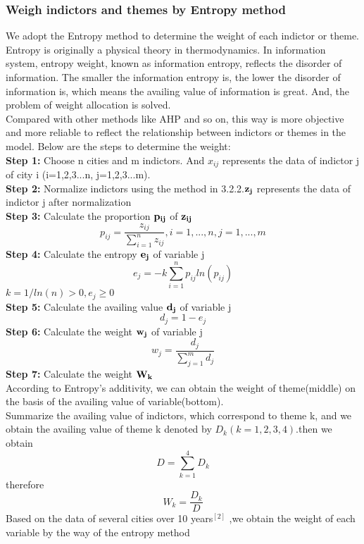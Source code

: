 \documentclass{mcmthesis}
\begin{document}
\subsubsection{Weigh indictors and themes by Entropy method}%
We adopt the Entropy method to determine the weight of each indictor or theme.\\
Entropy is originally a physical theory in thermodynamics. In information system, entropy weight, known as information entropy, reflects the disorder of information. The smaller  the information entropy is, the lower the disorder of information is, which means the availing value of information is great. And, the problem of weight allocation is solved. \\
Compared with other methods like AHP and so on, this way is more objective and more reliable to reflect the relationship between indictors or themes in the model. Below are the steps to determine the weight:\\
{\bf Step 1:} Choose n cities and m indictors. And $x_{ij}$ represents the data of indictor j of city i (i=1,2,3...n, j=1,2,3...m).\\
{\bf Step 2:}  Normalize indictors using the method in 3.2.2.$\bf z_j$ represents  the data of indictor j after normalization\\
{\bf Step 3:} Calculate the proportion $\bf p_{ij}$ of $\bf z_{ij}$
$$p_{ij}=\frac{z_{ij}}{\sum_{i=1}^nz_{ij}},i=1,...,n,j=1,...,m$$
{\bf Step 4:} Calculate the entropy $\bf e_j$ of variable j\\
$$e_j=-k\sum_{i=1}^np_{ij}ln(p_{ij})$$
$k=1/ln(n)>0,e_j\ge0$\\
{\bf Step 5:} Calculate the availing value $\bf d_j$ of variable j\\
$$d_j=1-e_j$$
{\bf Step 6:} Calculate the weight $\bf w_j$ of variable j\\
$$w_j=\frac{d_j}{\sum_{j=1}^{m}d_j}$$
{\bf Step 7:} Calculate the weight $\bf W_k$\\
According to Entropy's additivity, we can obtain the weight of theme(middle) on the basis of the availing value of variable(bottom). \\
Summarize the availing value of indictors, which correspond to theme k, and we obtain the availing value of theme k denoted by $D_k(k=1,2,3,4)$.then we obtain \\
$$D=\sum_{k=1}^4D_k$$
therefore\\
$$W_k=\frac{D_k}{D}$$
Based on the data of several cities over 10 years$^{[2]}$ ,we obtain the weight of each variable by the way of the entropy method\\
\end{document}
